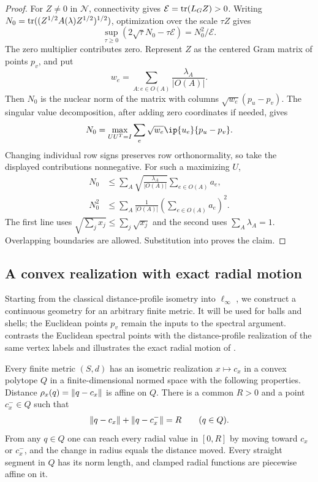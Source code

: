 \begin{proof}
For $Z\ne0$ in $\mathcal N$, connectivity gives
$\mathcal E=\operatorname{tr}(L_GZ)>0$.  Writing
$N_0=\operatorname{tr}((Z^{1/2}A(\lambda)Z^{1/2})^{1/2})$, optimization over the
scale $\tau Z$ gives
\[
 \sup_{\tau\ge0}(2\sqrt\tau N_0-\tau\mathcal E)
 =N_0^2/\mathcal E.
\]
The zero multiplier contributes zero.  Represent $Z$ as the centered
Gram matrix of points $p_v$, and put
\[
 w_e=\sum_{A:e\in O(A)}\frac{\lambda_A}{|O(A)|}.
\]
Then $N_0$ is the nuclear norm of the matrix with columns
$\sqrt{w_e}(p_u-p_v)$.  The singular value decomposition, after
adding zero coordinates if needed, gives
\[
 N_0=\max_{UU^T=I}\sum_e\sqrt{w_e}\ip{u_e}{p_u-p_v}.
\]
Changing individual row signs preserves row orthonormality, so take
the displayed contributions nonnegative.  For such a maximizing $U$,
\begin{align*}
 N_0
 &\le\sum_A\sqrt{\frac{\lambda_A}{|O(A)|}}
                  \sum_{e\in O(A)}a_e,\\
 N_0^2
 &\le\sum_A\frac1{|O(A)|}
                   \left(\sum_{e\in O(A)}a_e\right)^2.
\end{align*}
The first line uses $\sqrt{\sum_jx_j}\le\sum_j\sqrt{x_j}$ and
the second uses $\sum_A\lambda_A=1$.  Overlapping boundaries are
allowed.  Substitution into  proves the claim.
\end{proof}

\subsection{A convex realization with exact radial motion}

Starting from the classical distance-profile isometry into
$\ell_\infty$ \cite{Frechet1910,Kuratowski1935}, we construct a
continuous geometry for an arbitrary finite metric.  It will be used for balls and shells; the Euclidean
points $p_v$ remain the inputs to the spectral argument.
 contrasts the Euclidean spectral points with
the distance-profile realization of the same vertex labels and
illustrates the exact radial motion of .

\begin{lemma}\label{tg:profiles}
Every finite metric $(S,d)$ has an isometric realization
$x\mapsto c_x$ in a convex polytope $Q$ in a finite-dimensional
normed space with the following properties.  Distance
$\rho_x(q)=\lVert q-c_x\rVert$ is affine on $Q$.  There is a common $R>0$
and a point $c_x^-\in Q$ such that
\begin{equation}\label{tg:opposite-radii}
 \lVert q-c_x\rVert+\lVert q-c_x^-\rVert=R\qquad(q\in Q).
\end{equation}
From any $q\in Q$ one can reach every radial value in $[0,R]$ by
moving toward $c_x$ or $c_x^-$, and the change in radius equals
the distance moved.  Every straight segment in $Q$ has its norm
length, and clamped radial functions are piecewise affine on it.
\end{lemma}

